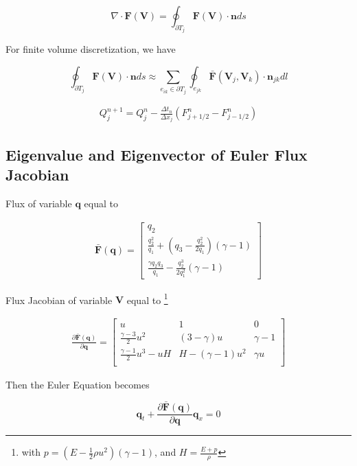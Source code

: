 \documentclass[11pt]{diazessay} %
\begin{document}
$$
\nabla\cdot \textbf{F}(\textbf{V}) = \oint_{\partial T_j} \textbf{F}(\textbf{V})\cdot \textbf{n} ds
$$

For finite volume discretization, we have\cite{li_multigrid_nodate}

$$
\oint_{\partial T_j} \textbf{F}(\textbf{V})\cdot \textbf{n} ds 
\approx \sum_{e_{ik}\in \partial T_j} \oint_{e_{jk}} \bar{\textbf{F}}(\textbf{V}_j, \textbf{V}_k)\cdot \textbf{n}_{jk} dl
$$


\begin{align}
    Q_j^{n+1} = Q_j^n - \frac{\Delta t_n}{\Delta x_j} (F_{j+1/2}^n - F_{j-1/2}^n)
\end{align}

\subsection{Eigenvalue and Eigenvector of Euler Flux Jacobian}

    Flux of variable $\textbf{q}$ equal to
    
    $$
    \begin{aligned}
        \bar{\textbf{F}}(\textbf{q})= \begin{bmatrix}
            q_2\\ 
            \frac{q_2^2}{q_1} + \left(q_3 - \frac{q_2^2}{2q_1}\right) (\gamma -1)\\
            \frac{\gamma q_2q_3}{q_1} - \frac{q_2^3}{2q_1^2}(\gamma -1)
        \end{bmatrix}
    \end{aligned}
    $$


    Flux Jacobian of variable $\textbf{V}$ equal to \footnote{with $p = (E - \frac{1}{2}\rho u^2)(\gamma -1)$, and $H=\frac{E+p}{\rho}$}

    $$
    \begin{aligned}
        \frac{\partial \bar{\textbf{F}}(\textbf{q})}{\partial \textbf{q}}= \begin{bmatrix}
            u & 1 & 0 \\
            \frac{\gamma -3}{2} u^2 & (3-\gamma)u & \gamma -1\\
            \frac{\gamma -1}{2}u^3-uH & H-(\gamma -1)u^2 & \gamma u\\
        \end{bmatrix}
    \end{aligned}
    $$

    Then the Euler Equation becomes 

    $$
    \textbf{q}_t + \frac{\partial \bar{\textbf{F}}(\textbf{q})}{\partial \textbf{q}}\textbf{q}_x= 0
    $$
\end{document}
